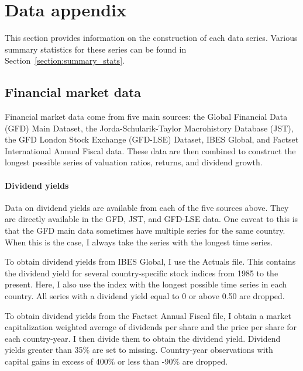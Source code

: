
\section{Data appendix}\label{section:dataAppendix}

This section provides information on the construction of each data series. Various summary statistics for these series can be found in Section~\ref{section:summary_stats}.

\subsection{Financial market data}\label{section:equity_app}

Financial market data come from five main sources: the Global Financial Data (GFD) Main Dataset, the Jorda-Schularik-Taylor Macrohistory Database (JST), the GFD London Stock Exchange (GFD-LSE) Dataset, IBES Global, and Factset International Annual Fiscal data.  These data are then combined to construct the longest possible series of valuation ratios, returns, and dividend growth.

\paragraph{Dividend yields}
Data on dividend yields are available from each of the five sources above.  They are directly available in the GFD, JST, and GFD-LSE data. One caveat to this is that the GFD main data sometimes have multiple series for the same country. When this is the case, I always take the series with the longest time series.

To obtain dividend yields from IBES Global, I use the Actuals file. This contains the dividend yield for several country-specific stock indices from 1985 to the present. Here, I also use the index with the longest possible time series in each country.  All series with a dividend yield equal to 0 or above 0.50 are dropped. 

To obtain dividend yields from the Factset Annual Fiscal file, I obtain a market capitalization weighted average of dividends per share and the price per share for each country-year. I then divide them to obtain the dividend yield. Dividend yields greater than 35\% are set to missing. Country-year observations with capital gains in excess of 400\% or less than -90\% are dropped.

